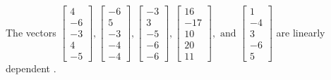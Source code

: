 \begin{exercise}
\begin{exerciseStatement}
  \end{exerciseStatement}
  \begin{exerciseAnswer}
   The vectors \(\left[\begin{array}{r}
4 \\
-6 \\
-3 \\
4 \\
-5
\end{array}\right] , \left[\begin{array}{r}
-6 \\
5 \\
-3 \\
-4 \\
-4
\end{array}\right] , \left[\begin{array}{r}
-3 \\
3 \\
-5 \\
-6 \\
-6
\end{array}\right] , \left[\begin{array}{r}
16 \\
-17 \\
10 \\
20 \\
11
\end{array}\right] , \text{ and } \left[\begin{array}{r}
1 \\
-4 \\
3 \\
-6 \\
5
\end{array}\right]\) are 
  	 linearly dependent  .
  


  \end{exerciseAnswer}
\end{exercise}